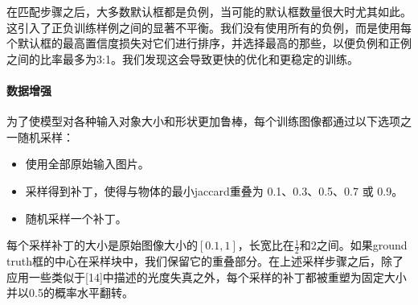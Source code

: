 \documentclass[../main.tex]{subfile}
\begin{document}
在匹配步骤之后，大多数默认框都是负例，当可能的默认框数量很大时尤其如此。这引入了正负训练样例之间的显著不平衡。我们没有使用所有的负例，而是使用每个默认框的最高置信度损失对它们进行排序，并选择最高的那些，以便负例和正例之间的比率最多为3:1。我们发现这会导致更快的优化和更稳定的训练。

\paragraph{数据增强}

为了使模型对各种输入对象大小和形状更加鲁棒，每个训练图像都通过以下选项之一随机采样：
\begin{itemize}
    \item 使用全部原始输入图片。
    \item 采样得到补丁，使得与物体的最小jaccard重叠为 0.1、0.3、0.5、0.7 或 0.9。
    \item 随机采样一个补丁。
\end{itemize}
每个采样补丁的大小是原始图像大小的$\left[ 0.1, 1 \right]$，长宽比在$\frac{1}{2}$和$2$之间。如果ground truth框的中心在采样块中，我们保留它的重叠部分。在上述采样步骤之后，除了应用一些类似于[14]中描述的光度失真之外，每个采样的补丁都被重塑为固定大小并以0.5的概率水平翻转。
\end{document}

